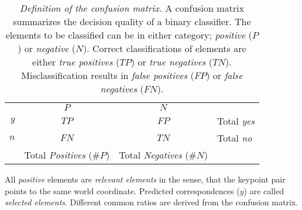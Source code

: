 {\renewcommand{\arraystretch}{1.2}%
\begin{table}[H]
\setlength\tabcolsep{0.5em}
\begin{tabular}{r|c|c|l}
    \multicolumn{1}{r}{} &
    \multicolumn{1}{c}{$P$} &
    \multicolumn{1}{c}{$N$} &
    \multicolumn{1}{l}{} \\
  \cline{2-3}
  $y$ & $TP$  & $FP$ & Total \emph{yes} \\
  \cline{2-3}
  $n$ & $FN$  & $TN$ & Total \emph{no} \\
  \cline{2-3}
    \multicolumn{1}{r}{} &
    \multicolumn{1}{c}{Total \emph{Positives} ($\#P$)} &
    \multicolumn{1}{c}{Total \emph{Negatives} ($\#N$)}
\end{tabular}
\caption[Definition of the confusion matrix]{\emph{Definition of the confusion matrix.} A confusion matrix summarizes the decision quality of a binary classifier. The elements to be classified can be in either category; \emph{positive} ($P$) or \emph{negative} ($N$). Correct classifications of elements are either \emph{true positives} ($TP$) or \emph{true negatives} ($TN$). Misclassification results in \emph{false positives} ($FP$) or \emph{false negatives} ($FN$).}\label{tab:def_confusion_matrix}
\end{table}}

All \emph{positive} elements are \emph{relevant elements} in the sense, that the keypoint pair points to the same world coordinate.
Predicted correspondences ($y$) are called \emph{selected elements}.
Different common ratios are derived from the confusion matrix\cite{fawcett_2006}.

